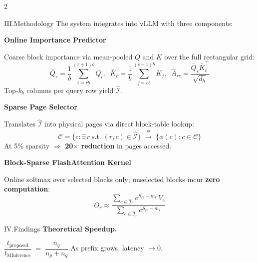 \documentclass[a0paper]{article}
\newcommand{\step}[1]{%
  \tikz[baseline=(S.base)]{%
    \node[circle, fill=SlateBlue, text=white,
          font=\sffamily\bfseries\fontsize{22}{26}\selectfont,
          minimum size=32pt, inner sep=0pt] (S) {#1};%
  }\;%
}
\begin{document}
\begin{multicols}{2}
\vfill\null
\columnbreak

\begin{posterbox}{III.\;\;Methodology}
  The system integrates into vLLM with three components:

  \vspace{0.4em}
  \step{1}\textbf{Online Importance Predictor}

  \vspace{0.15em}
  Coarse block importance via mean-pooled $Q$ and $K$ over the
  full rectangular grid:
  \[
    \bar{Q}_r = \frac{1}{b}\!\sum_{i=rb}^{(r+1)b}\! Q_i,\;\;
    \bar{K}_c = \frac{1}{b}\!\sum_{j=cb}^{(c+1)b}\! K_j,\;\;
    \hat{A}_{rc} = \frac{\bar{Q}_r \bar{K}_c^\top}{\!\sqrt{d_h}}
  \]
  Top-$k_b$ columns per query row yield $\hat{\mathcal{I}}$.

  \vspace{0.5em}
  \step{2}\textbf{Sparse Page Selector}

  \vspace{0.15em}
  Translates $\hat{\mathcal{I}}$ into physical pages via direct
  block-table lookup:
  \[
    \mathcal{C} = \{c : \exists\, r\;\text{s.t.}\;(r,c)
      \in \hat{\mathcal{I}}\}
    \;\xrightarrow{\;\phi\;}
    \;\{\phi(c) : c \in \mathcal{C}\}
  \]
  At 5\% sparsity $\Rightarrow$ \textbf{20$\times$ reduction}
  in pages accessed.

  \vspace{0.5em}
  \step{3}\textbf{Block-Sparse FlashAttention Kernel}

  \vspace{0.15em}
  Online softmax over selected blocks only; unselected blocks
  incur \textbf{zero computation}:
  \[
    O_r \approx
    \frac{\sum_{c \in \hat{\mathcal{I}}_r}
          e^{S_{rc} - m_r}\,V_c}
         {\sum_{c \in \hat{\mathcal{I}}_r}
          e^{S_{rc} - m_r}}
  \]
\end{posterbox}

\begin{posterbox}{IV.\;\;Findings}
  \textbf{Theoretical Speedup.}

  \vspace{0.15em}
  \begin{eqbox}
    \centering
    $\dfrac{t_{\text{proposed}}}{t_{\text{MInference}}}
    \;=\; \dfrac{n_q}{n_p + n_q}$
    \qquad As prefix grows, latency $\to 0$.
  \end{eqbox}


\end{posterbox}
\end{multicols}
\end{document}
